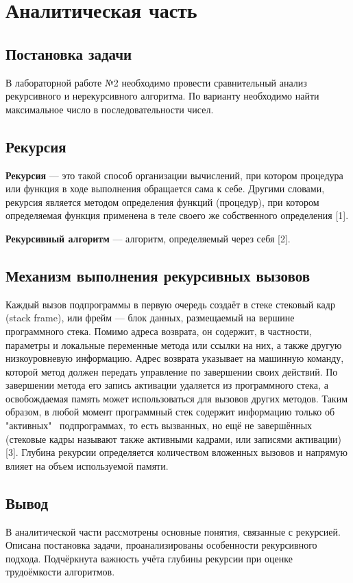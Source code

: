 \chapter{Аналитическая часть}

\section{Постановка задачи}
В лабораторной работе №2 необходимо провести сравнительный анализ рекурсивного и нерекурсивного алгоритма. По варианту необходимо найти максимальное число в последовательности чисел.

\section{Рекурсия}
\textbf{Рекурсия} — это такой способ организации вычислений, при котором процедура или функция в ходе выполнения обращается сама к себе. Другими словами, рекурсия является методом определения функций (процедур), при котором определяемая функция применена в теле своего же собственного определения [1].

\textbf{Рекурсивный алгоритм} — алгоритм, определяемый через себя [2].

\section{Механизм выполнения рекурсивных вызовов}
 Каждый вызов подпрограммы в первую очередь создаёт в стеке стековый кадр (stack frame), или фрейм — блок данных, размещаемый на вершине программного стека. Помимо адреса возврата, он содержит, в частности, параметры и локальные переменные метода или ссылки на них, а также другую низкоуровневую информацию. Адрес возврата указывает на машинную команду, которой метод должен передать управление по завершении своих действий. По завершении метода его запись активации удаляется из программного стека, а освобождаемая память может использоваться для вызовов других методов. Таким образом, в любой момент программный стек содержит информацию только об "активных"  подпрограммах, то есть вызванных, но ещё не завершённых (стековые кадры называют также активными кадрами, или записями активации) [3]. Глубина рекурсии определяется количеством вложенных вызовов и напрямую влияет на объем используемой памяти.
 
 \section*{Вывод}
В аналитической части рассмотрены основные понятия, связанные с рекурсией. Описана постановка задачи, проанализированы особенности рекурсивного подхода. Подчёркнута важность учёта глубины рекурсии при оценке трудоёмкости алгоритмов.
 
\clearpage
